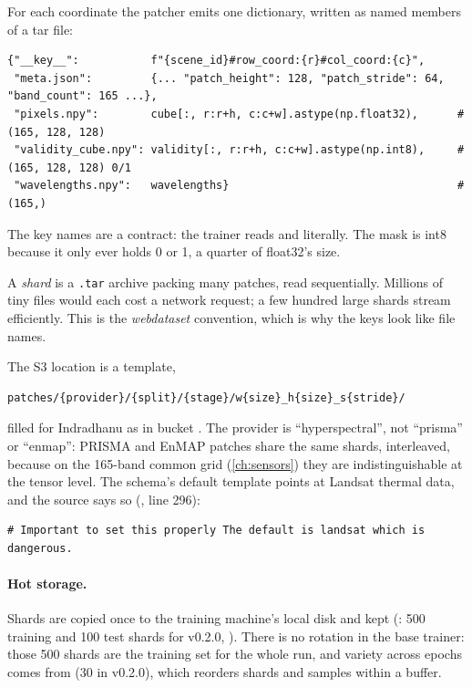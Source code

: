 For each coordinate the patcher emits one dictionary, written as named members of a tar file:
\begin{lstlisting}
{"__key__":           f"{scene_id}#row_coord:{r}#col_coord:{c}",
 "meta.json":         {... "patch_height": 128, "patch_stride": 64, "band_count": 165 ...},
 "pixels.npy":        cube[:, r:r+h, c:c+w].astype(np.float32),      # (165, 128, 128)
 "validity_cube.npy": validity[:, r:r+h, c:c+w].astype(np.int8),     # (165, 128, 128) 0/1
 "wavelengths.npy":   wavelengths}                                   # (165,)
\end{lstlisting}
The key names are a contract: the trainer reads  and
 literally. The mask is int8 because it only ever holds 0 or 1,
a quarter of float32's size.

\begin{definition}[Shard]
A \emph{shard} is a \texttt{.tar} archive packing many patches, read sequentially. Millions of
tiny files would each cost a network request; a few hundred large shards stream efficiently.
This is the \emph{webdataset} convention, which is why the keys look like file names.
\end{definition}

The S3 location is a template,
\begin{lstlisting}[language={}]
patches/{provider}/{split}/{stage}/w{size}_h{size}_s{stride}/
\end{lstlisting}
filled for Indradhanu as  in bucket
 . The provider is
``hyperspectral'', not ``prisma'' or ``enmap'': PRISMA and EnMAP patches share the same
shards, interleaved, because on the 165-band common grid (\cref{ch:sensors}) they are
indistinguishable at the tensor level. The schema's default template points at Landsat thermal
data, and the source says so (, line 296):
\begin{lstlisting}
# Important to set this properly The default is landsat which is dangerous.
\end{lstlisting}

\paragraph{Hot storage.} Shards are copied once to the training machine's local disk and kept
(: 500 training and 100 test shards for v0.2.0, ). There is no rotation in the base trainer: those 500 shards are the training set for the
whole run, and variety across epochs comes from  (30 in v0.2.0), which
reorders shards and samples within a buffer.

